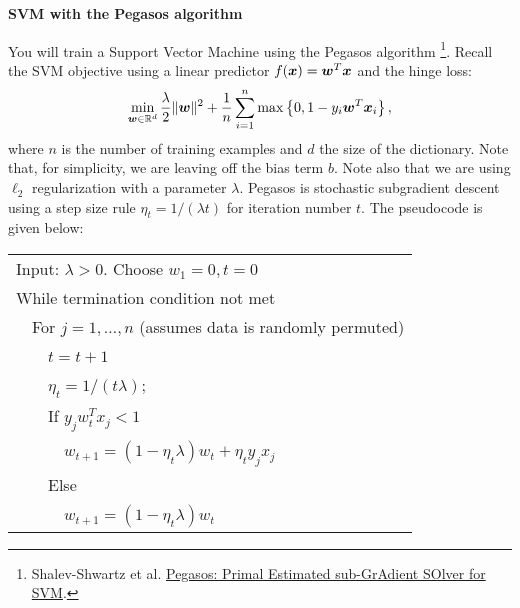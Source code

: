 \documentclass{article}
\newcommand{\nyuparagrah}[1]{\textcolor{nyupurple}{\large #1}}
\theoremstyle{plain}
\theoremstyle{definition}
\begin{document}
\nyuparagrah{\bf SVM with the Pegasos algorithm}

You will train a Support Vector Machine using the Pegasos algorithm
\footnote{Shalev-Shwartz et al. \href{http://ttic.uchicago.edu/~nati/Publications/PegasosMPB.pdf}{Pegasos: Primal Estimated sub-GrAdient SOlver for SVM}.}.
Recall the SVM objective using a linear predictor $f(\boldsymbol{x}) = \boldsymbol{w} ^T \boldsymbol{x}$ and the hinge loss:
\[
\min_{\boldsymbol{w}\in\mathbb{R}^{d}}\frac{\lambda}{2}\|\boldsymbol{w}\|^{2}+\frac{1}{n}\sum_{i=1}^{n}\max\left\{ 0,1-y_{i}\boldsymbol{w}^{T}\boldsymbol{x}_{i}\right\} ,
\]
where $n$ is the number of training examples and $d$ the size of the dictionary.
Note that, for simplicity, we are leaving off the 
bias
term $b$. Note also that we are using $\ell_2$ regularization with a parameter $\lambda$. Pegasos is stochastic subgradient descent using a step
size rule $\eta_{t}=1/\left(\lambda t\right)$ for iteration number $t$. The pseudocode is
given below:
\begin{center}
\begin{tabular}{l}
\hline 
Input: $\lambda>0$. Choose $w_{1}=0,t=0$\tabularnewline
While termination condition not met\tabularnewline
\ \ For $j=1,\ldots,n$ (assumes data is randomly permuted)\tabularnewline
\ \ \ \ $t=t+1$\tabularnewline
\ \ \ \ $\eta_{t}=1/\left(t\lambda\right)$;\tabularnewline
\ \ \ \ If $y_{j}w_{t}^{T}x_{j}<1$\tabularnewline
\ \ \ \ \ \ $w_{t+1}=(1-\eta_{t}\lambda)w_{t}+\eta_{t}y_{j}x_{j}$\tabularnewline
\ \ \ \ Else \tabularnewline
\ \ \ \ \ \ $w_{t+1}=(1-\eta_{t}\lambda)w_{t}$\tabularnewline
\hline 
\end{tabular}
\par\end{center}
\end{document}
